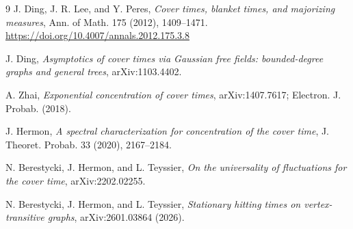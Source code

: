 \documentclass[11pt]{article}
\begin{document}
\begin{thebibliography}{9}
J. Ding, J. R. Lee, and Y. Peres,
\emph{Cover times, blanket times, and majorizing measures},
Ann. of Math. 175 (2012), 1409--1471.
\url{https://doi.org/10.4007/annals.2012.175.3.8}

J. Ding,
\emph{Asymptotics of cover times via Gaussian free fields: bounded-degree graphs and general trees},
arXiv:1103.4402.

A. Zhai,
\emph{Exponential concentration of cover times},
arXiv:1407.7617; Electron. J. Probab. (2018).

J. Hermon,
\emph{A spectral characterization for concentration of the cover time},
J. Theoret. Probab. 33 (2020), 2167--2184.

N. Berestycki, J. Hermon, and L. Teyssier,
\emph{On the universality of fluctuations for the cover time},
arXiv:2202.02255.

N. Berestycki, J. Hermon, and L. Teyssier,
\emph{Stationary hitting times on vertex-transitive graphs},
arXiv:2601.03864 (2026).
\end{thebibliography}
\end{document}
